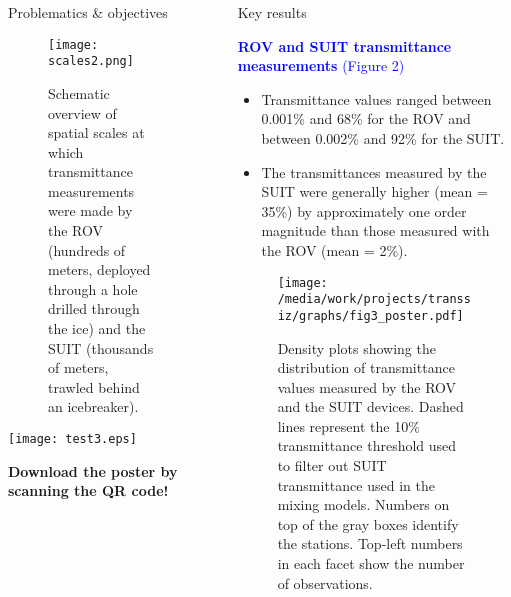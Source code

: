 \documentclass[final]{beamer}
\newlength{\sepwidth}
\newlength{\colwidth}
\newcommand{\separatorcolumn}{\begin{column}{\sepwidth}\end{column}}
\begin{document}
\begin{frame}[t]
\begin{columns}[t]
\begin{column}{\colwidth}
\begin{block}{Problematics \& objectives}
				\begin{figure}
					\centering
					\texttt{[image: scales2.png]}
					\caption{Schematic overview of spatial scales at which transmittance measurements were made by the ROV (hundreds of meters, deployed through a hole drilled through the ice) and the SUIT (thousands of meters, trawled behind an icebreaker).}
				\end{figure}

			\end{block}

			\vspace{0.0cm}
			\begin{minipage}[c]{0.12\textwidth}
				\texttt{[image: test3.eps]}
			\end{minipage}
			\begin{minipage}[c]{0.75\textwidth}
				{\large \textbf{Download the poster by scanning the QR code!}}
			\end{minipage}

		\end{column}

		\separatorcolumn

		\begin{column}{\colwidth}

			\begin{block}{Key results}

				\textcolor{blue}{\large \textbf{ROV and SUIT transmittance measurements} (Figure 2)}

				\begin{itemize}
					\justifying
					\setlength\itemsep{1.5em}
					\item Transmittance values ranged between 0.001\% and 68\% for the ROV and between 0.002\% and 92\% for the SUIT.
					\item The transmittances measured by the SUIT were generally higher (mean = 35\%) by approximately one order magnitude than those measured with the ROV (mean = 2\%).
				\end{itemize}

				\begin{figure}
					\centering
					\texttt{[image: /media/work/projects/transsiz/graphs/fig3\_poster.pdf]}
					\caption{Density plots showing the distribution of transmittance values measured by the ROV and the SUIT devices. Dashed lines represent the 10\% transmittance threshold used to filter out SUIT transmittance used in the mixing models. Numbers on top of the gray boxes identify the stations. Top-left numbers in each facet show the number of observations.}
				\end{figure}


\end{block}
\end{column}
\end{columns}
\end{frame}
\end{document}
